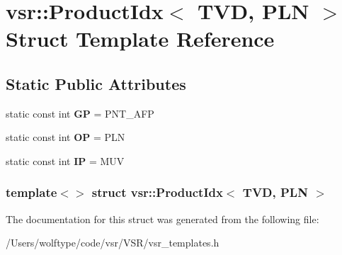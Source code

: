 \hypertarget{structvsr_1_1_product_idx_3_01_t_v_d_00_01_p_l_n_01_4}{\section{vsr\-:\-:Product\-Idx$<$ T\-V\-D, P\-L\-N $>$ Struct Template Reference}
\label{structvsr_1_1_product_idx_3_01_t_v_d_00_01_p_l_n_01_4}
}
\subsection*{Static Public Attributes}
\begin{DoxyCompactItemize}
\item 
\hypertarget{structvsr_1_1_product_idx_3_01_t_v_d_00_01_p_l_n_01_4_ac391c114529fddc34304f1968609990c}{static const int {\bfseries G\-P} = P\-N\-T\-\_\-\-A\-F\-P}\label{structvsr_1_1_product_idx_3_01_t_v_d_00_01_p_l_n_01_4_ac391c114529fddc34304f1968609990c}

\item 
\hypertarget{structvsr_1_1_product_idx_3_01_t_v_d_00_01_p_l_n_01_4_acfae88155ba7ea648f46cfd94cce7cd0}{static const int {\bfseries O\-P} = P\-L\-N}\label{structvsr_1_1_product_idx_3_01_t_v_d_00_01_p_l_n_01_4_acfae88155ba7ea648f46cfd94cce7cd0}

\item 
\hypertarget{structvsr_1_1_product_idx_3_01_t_v_d_00_01_p_l_n_01_4_a087839fd4925238e0b0394ddb995c85f}{static const int {\bfseries I\-P} = M\-U\-V}\label{structvsr_1_1_product_idx_3_01_t_v_d_00_01_p_l_n_01_4_a087839fd4925238e0b0394ddb995c85f}

\end{DoxyCompactItemize}
\subsubsection*{template$<$$>$ struct vsr\-::\-Product\-Idx$<$ T\-V\-D, P\-L\-N $>$}



The documentation for this struct was generated from the following file\-:\begin{DoxyCompactItemize}
\item 
/\-Users/wolftype/code/vsr/\-V\-S\-R/vsr\-\_\-templates.\-h\end{DoxyCompactItemize}
